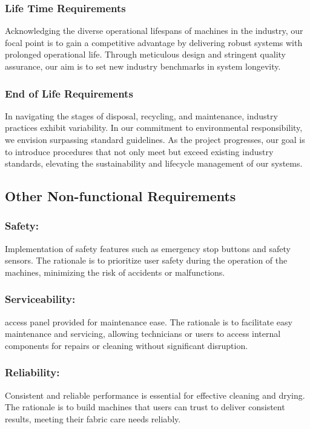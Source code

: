 \documentclass[12pt]{article} %
\begin{document}
 
 \subsubsection{Life Time Requirements} Acknowledging the diverse operational lifespans of machines in the industry, our focal point is to gain a competitive advantage by delivering robust systems with prolonged operational life. Through meticulous design and stringent quality assurance, our aim is to set new industry benchmarks in system longevity.
 
 \subsubsection{End of Life Requirements} In navigating the stages of disposal, recycling, and maintenance, industry practices exhibit variability. In our commitment to environmental responsibility, we envision surpassing standard guidelines. As the project progresses, our goal is to introduce procedures that not only meet but exceed existing industry standards, elevating the sustainability and lifecycle management of our systems.


\subsection{Other Non-functional Requirements}

 \subsubsection{Safety:} Implementation of safety features such as emergency stop buttons and safety sensors. The rationale is to prioritize user safety during the operation of the machines, minimizing the risk of accidents or malfunctions.
 
 \subsubsection{Serviceability:} \gls{access panel} provided for maintenance ease. The rationale is to facilitate easy maintenance and servicing, allowing technicians or users to access internal components for repairs or cleaning without significant disruption.
 
 \subsubsection{Reliability:} Consistent and reliable performance is essential for effective cleaning and drying. The rationale is to build machines that users can trust to deliver consistent results, meeting their fabric care needs reliably.
 
\end{document}
